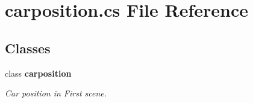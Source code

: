 \section{carposition.\+cs File Reference}
\label{carposition_8cs}
\subsection*{Classes}
\begin{DoxyCompactItemize}
\item 
class {\bf carposition}
\begin{DoxyCompactList}\small\item\em Car position in First scene. \end{DoxyCompactList}\end{DoxyCompactItemize}
